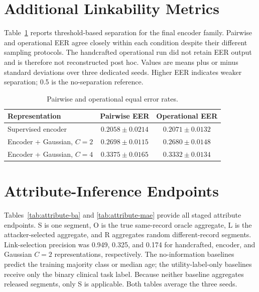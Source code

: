 \documentclass[journal]{IEEEtran}
\begin{document}
\section{Additional Linkability Metrics}
\label{app:eer}

Table~\ref{tab:eer-appendix} reports threshold-based separation for the final
encoder family. Pairwise and operational EER agree closely within each
condition despite their different sampling protocols. The handcrafted operational
run did not retain EER output and is therefore not reconstructed post hoc.
Values are means plus or minus standard deviations over three dedicated seeds.
Higher EER indicates weaker separation; 0.5 is the no-separation reference.

\begin{table}[ht]
\centering
\scriptsize
\caption{Pairwise and operational equal error rates.}
\label{tab:eer-appendix}
\begin{tabular}{lcc}
\toprule
Representation & Pairwise EER & Operational EER \\
\midrule
Supervised encoder & $0.2058\mathbin{\pm}0.0214$ & $0.2071\mathbin{\pm}0.0132$ \\
Encoder + Gaussian, $C=2$ & $0.2698\mathbin{\pm}0.0115$ & $0.2680\mathbin{\pm}0.0148$ \\
Encoder + Gaussian, $C=4$ & $0.3375\mathbin{\pm}0.0165$ & $0.3332\mathbin{\pm}0.0134$ \\
\bottomrule
\end{tabular}
\end{table}

\section{Attribute-Inference Endpoints}
\label{app:attributes}

Tables~\ref{tab:attribute-ba} and \ref{tab:attribute-mae} provide all staged
attribute endpoints. S is one segment, O is the true same-record oracle
aggregate, L is the attacker-selected aggregate, and R aggregates random
different-record segments. Link-selection precision was 0.949, 0.325, and
0.174 for handcrafted, encoder, and Gaussian $C=2$ representations, respectively. The
no-information baselines predict the training majority class or median age;
the utility-label-only baselines receive only the binary clinical task label.
Because neither baseline aggregates released segments, only S is applicable.
Both tables average the three seeds.
\end{document}
